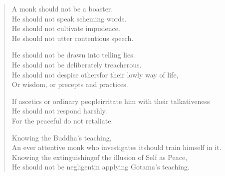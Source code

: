 \begin{verse}
 A monk should not be a boaster.\\
He should not speak scheming words.\\
He should not cultivate impudence.\\
He should not utter contentious speech.


 He should not be drawn into telling lies.\\
He should not be deliberately treacherous.\\
He should not despise others\newline for their lowly way of life,\\
Or wisdom, or precepts and practices.


 If ascetics or ordinary people\newline irritate him with their talkativeness\\
He should not respond harshly.\\
For the peaceful do not retaliate.


 Knowing the Buddha's teaching,\\
An ever attentive monk who investigates it\newline should train himself in it.\\
Knowing the extinguishing\newline of the illusion of Self as Peace,\\
He should not be negligent\newline in applying Gotama's teaching.


\end{verse}

